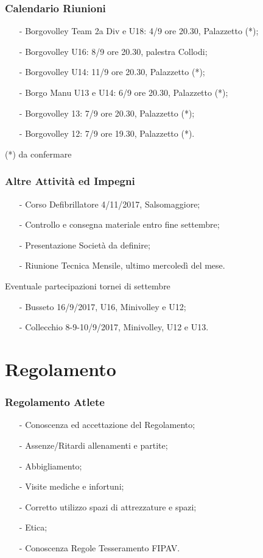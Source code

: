 \documentclass{beamer}
\begin{document}
\begin{frame}
\frametitle{Calendario Riunioni}
\begin{itemize}
\item[-]Borgovolley Team 2a Div e U18: 4/9 ore 20.30, Palazzetto (*);
\item[-]Borgovolley U16: 8/9 ore 20.30, palestra Collodi;
\item[-]Borgovolley U14: 11/9 ore 20.30, Palazzetto (*);
\item[-]Borgo Manu U13 e U14: 6/9 ore 20.30, Palazzetto (*);
\item[-]Borgovolley 13: 7/9 ore 20.30,  Palazzetto (*);
\item[-]Borgovolley 12: 7/9 ore 19.30, Palazzetto (*).
\end{itemize}

(*) da confermare
\end{frame}


\begin{frame}
\frametitle{Altre Attività ed Impegni}
\begin{itemize}
\item[-]Corso Defibrillatore 4/11/2017, Salsomaggiore;
\item[-]Controllo e consegna materiale entro fine settembre;
\item[-]Presentazione Società da definire;
\item[-]Riunione Tecnica Mensile, ultimo mercoledì del mese.
\end{itemize}

\begin{block}{Eventuale partecipazioni tornei di settembre}
\begin{itemize}
\item[-]Busseto 16/9/2017, U16, Minivolley e U12;
\item[-]Collecchio 8-9-10/9/2017, Minivolley, U12 e U13.
\end{itemize}
\end{block}
\end{frame}

\section{Regolamento}


\begin{frame}
\frametitle{Regolamento Atlete}
\begin{itemize}
\item[-]Conoscenza ed accettazione del Regolamento;
\item[-]Assenze/Ritardi allenamenti e partite;
\item[-]Abbigliamento;
\item[-]Visite mediche e infortuni;
\item[-]Corretto utilizzo spazi di attrezzature e spazi;
\item[-]Etica;
\item[-]Conoscenza Regole Tesseramento FIPAV.
\end{itemize}
\end{frame}
\end{document}
